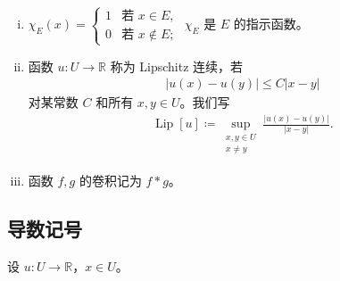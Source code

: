\documentclass[../main.tex]{subfiles}
\begin{document}
\begin{enumerate}[(i)]
\item $\chi_E(x)=\begin{cases}1 & \text{若 } x\in E,\\ 0 & \text{若 } x\notin E;\end{cases}$ $\chi_E$ 是 $E$ 的指示函数。

\item 函数 $u:U\to\mathbb{R}$ 称为 Lipschitz 连续，若
\begin{align*}
|u(x)-u(y)|\leqslant C|x-y|
\end{align*}
对某常数 $C$ 和所有 $x,y\in U$。我们写
\begin{align*}
\operatorname{Lip}[u]\coloneqq\sup_{\substack{x,y\in U\\x\neq y}}\frac{|u(x)-u(y)|}{|x-y|}.
\end{align*}

\item 函数 $f,g$ 的卷积记为 $f*g$。
\end{enumerate}

\subsection{导数记号}\label{subsection:appA-导数记号}

设 $u:U\to\mathbb{R}$，$x\in U$。
\end{document}

